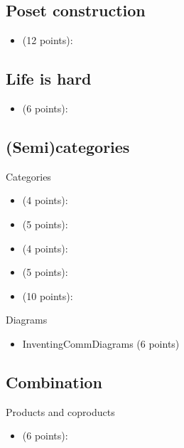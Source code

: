 \subsection{Poset construction}
\begin{itemize}
    \item {} (12 points): 
\end{itemize}

\subsection{Life is hard}
\begin{itemize}
    \item {} (6 points): 
\end{itemize}

\subsection{(Semi)categories}

Categories
\begin{itemize}
    \item {} (4 points): 
    \item {} (5 points): 
    \item {} (4 points): 
    \item {} (5 points): 
    \item {} (10 points): 
\end{itemize}

Diagrams
\begin{itemize}
    \item InventingCommDiagrams (6 points) 
\end{itemize}

\subsection{Combination}

Products and coproducts
\begin{itemize}
    \item {} (6 points): 
\end{itemize}

